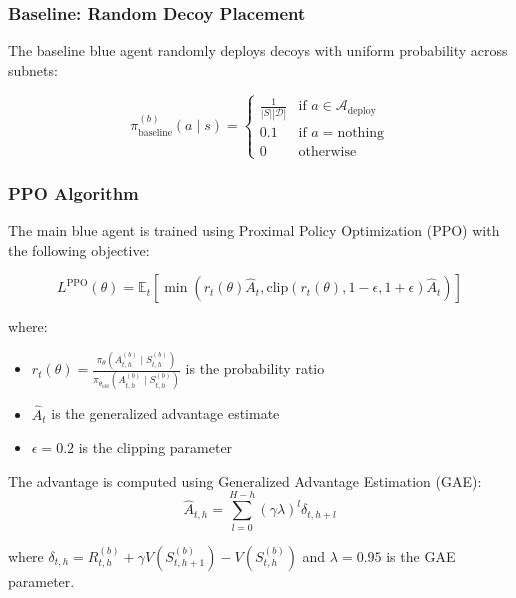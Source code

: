 \documentclass[11pt]{article}
\theoremstyle{definition}
\theoremstyle{plain}
\newcommand{\MC}[1]{\mathcal{#1}}
\newcommand{\EE}{\mathbb{E}}
\begin{document}
\subsubsection{Baseline: Random Decoy Placement}
The baseline blue agent randomly deploys decoys with uniform probability across subnets:

\begin{equation}
\pi^{(b)}_{\text{baseline}}(a \mid s) = \begin{cases}
\frac{1}{|S||\MC{D}|} & \text{if } a \in \MC{A}_{\text{deploy}} \\
0.1 & \text{if } a = \text{nothing} \\
0 & \text{otherwise}
\end{cases}
\end{equation}

\subsubsection{PPO Algorithm}
The main blue agent is trained using Proximal Policy Optimization (PPO) with the following objective:

\begin{equation}
L^{\text{PPO}}(\theta) = \EE_{t}\left[\min\left(r_t(\theta)\hat{A}_t, \text{clip}(r_t(\theta), 1-\epsilon, 1+\epsilon)\hat{A}_t\right)\right]
\end{equation}

where:
\begin{itemize}
    \item $r_t(\theta) = \frac{\pi_\theta(A_{t,h}^{(b)} \mid S_{t,h}^{(b)})}{\pi_{\theta_{\text{old}}}(A_{t,h}^{(b)} \mid S_{t,h}^{(b)})}$ is the probability ratio
    \item $\hat{A}_t$ is the generalized advantage estimate
    \item $\epsilon = 0.2$ is the clipping parameter
\end{itemize}

The advantage is computed using Generalized Advantage Estimation (GAE):
\begin{equation}
\hat{A}_{t,h} = \sum_{l=0}^{H-h} (\gamma \lambda)^l \delta_{t,h+l}
\end{equation}

where $\delta_{t,h} = R_{t,h}^{(b)} + \gamma V(S_{t,h+1}^{(b)}) - V(S_{t,h}^{(b)})$ and $\lambda = 0.95$ is the GAE parameter.
\end{document}
